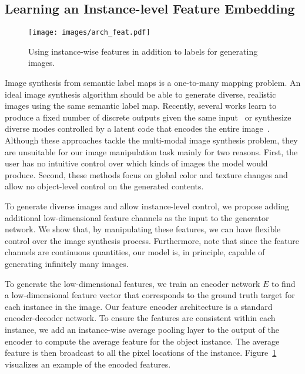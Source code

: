 \documentclass[10pt,twocolumn,letterpaper]{article}
\newcommand{\lblfig}[1]{\label{fig:#1}}
\newcommand{\lblsec}[1]{\label{sec:#1}}
\begin{document}
\subsection{Learning an Instance-level Feature Embedding}
\lblsec{alg:feat}
\begin{figure}
  \centering
  \texttt{[image: images/arch\_feat.pdf]}   
  \caption{Using instance-wise features in addition to labels for generating images. 
  }
  \lblfig{feat}
\end{figure}

Image synthesis from semantic label maps is a one-to-many mapping problem. An ideal image synthesis algorithm should be able to generate diverse, realistic images using the same semantic label map. Recently, several works learn to produce a fixed number of discrete outputs given the same input~\cite{ghosh2017multi,chen2017photographic} or synthesize diverse modes controlled by a latent code that encodes the entire image~\cite{zhu2017toward}. Although these approaches tackle the multi-modal image synthesis problem, they are unsuitable for our image manipulation task mainly for two reasons.
First, the user has no intuitive control over which kinds of images the model would produce\cite{ghosh2017multi,chen2017photographic}.
Second, these methods focus on global color and texture changes and allow no object-level control on the generated contents. 

To generate diverse images and allow instance-level control, we propose adding additional low-dimensional feature channels as the input to the generator network. We show that, by manipulating these features, we can have flexible control over the image synthesis process. Furthermore, note that since the feature channels are continuous quantities, our model is, in principle, capable of generating infinitely many images.

To generate the low-dimensional features, we train an encoder network $E$ to find a low-dimensional feature vector that corresponds to the ground truth target for each instance in the image. Our feature encoder architecture is a standard encoder-decoder network. To ensure the features are consistent within each instance, we add an instance-wise average pooling layer to the output of the encoder to compute the average feature for the object instance. The average feature is then broadcast to all the pixel locations of the instance. Figure~\ref{fig:feat} visualizes an example of the encoded features.
\end{document}
